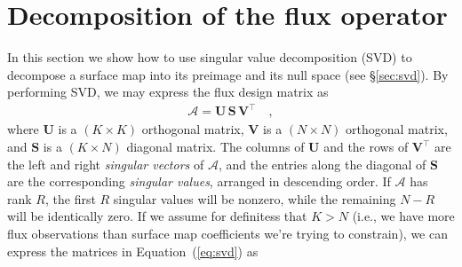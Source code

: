 \documentclass[modern]{aastex62}
\begin{document}
\section{Decomposition of the flux operator}
\label{sec:app-svd}
%
In this section we show how to use singular value decomposition (SVD)
to decompose a surface map
into its preimage and its null space (see \S\ref{sec:svd}). By performing SVD, we
may express the flux design matrix as
%
\begin{align}
    \label{eq:svd}
    \pmb{\mathcal{A}} = \mathbf{U} \, \mathbf{S} \, \mathbf{V}^\top
    \quad,
\end{align}
%
where $\mathbf{U}$ is a $(K \times K)$ orthogonal matrix,
$\mathbf{V}$ is a $(N \times N)$ orthogonal matrix,
and $\mathbf{S}$ is a $(K \times N)$ diagonal matrix.
%
The columns of $\mathbf{U}$ and the rows of $\mathbf{V}^\top$ are the left and right
\emph{singular vectors} of $\pmb{\mathcal{A}}$, and the entries along the
diagonal of $\mathbf{S}$ are the corresponding \emph{singular values}, arranged
in descending order. If $\pmb{\mathcal{A}}$
has rank $R$, the first $R$ singular values will be nonzero, while the
remaining $N - R$ will be identically zero.
%
If we assume for definitess that $K > N$ (i.e., we have more flux observations
than surface map coefficients we're trying to constrain), we can express the
matrices in Equation~(\ref{eq:svd}) as
%
\end{document}
